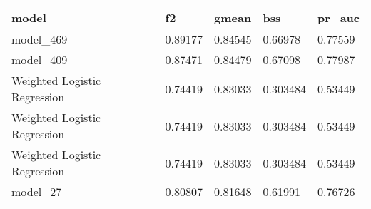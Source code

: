 \begin{tabular}{|l|l|l|l|l|}
\hline
\textbf{model}               & \textbf{f2} & \textbf{gmean} & \textbf{bss} & \textbf{pr\_auc} \\ \hline
model\_469                   & 0.89177     & 0.84545        & 0.66978      & 0.77559          \\ \hline
model\_409                   & 0.87471     & 0.84479        & 0.67098      & 0.77987          \\ \hline
Weighted Logistic Regression & 0.74419     & 0.83033        & 0.303484     & 0.53449          \\ \hline
Weighted Logistic Regression & 0.74419     & 0.83033        & 0.303484     & 0.53449          \\ \hline
Weighted Logistic Regression & 0.74419     & 0.83033        & 0.303484     & 0.53449          \\ \hline
model\_27                    & 0.80807     & 0.81648        & 0.61991      & 0.76726          \\ \hline
\end{tabular}